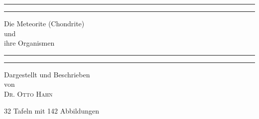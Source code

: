 \documentclass[a4paper, 11pt, oneside]{article}
\begin{document}
\frakfamily
\begin{titlepage} %
	\centering %
	\scshape %

	
	\rule{\textwidth}{1.6pt}\vspace*{-\baselineskip}\vspace*{2pt} %
	\rule{\textwidth}{0.4pt} %
	
	\vspace{0.75\baselineskip} %
	
	{\LARGE Die Meteorite (Chondrite)\\ und\\ ihre Organismen\\} %
	
	\vspace{0.75\baselineskip} %
	
	\rule{\textwidth}{0.4pt}\vspace*{-\baselineskip}\vspace{3.2pt} %
	\rule{\textwidth}{1.6pt} %
	
	\vspace{1\baselineskip} %
	
	
	{Dargestellt und Beschrieben\\ von\\ \scshape\Large Dr. Otto Hahn\\} %
	
	\vspace*{1\baselineskip} %
	
    {\small 32 Tafeln mit 142 Abbildungen} %
    
	
	\vspace{1\baselineskip} %
	
	

\end{titlepage}
\end{document}
